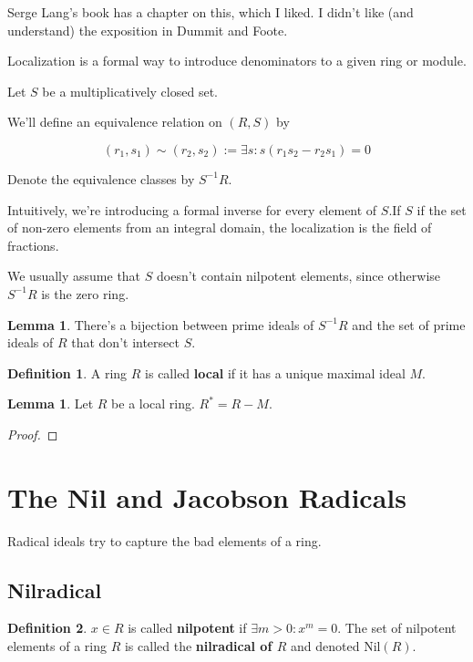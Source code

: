 \documentclass{article}
\theoremstyle{definition}
\newtheorem{definition}{Definition}
\newtheorem{lemma}[theorem]{Lemma}
\newcommand{\Nil}{\text{Nil}}
\begin{document}
Serge Lang's book has a chapter on this, which I liked. I didn't like (and understand)
the exposition in Dummit and Foote.

Localization is a formal way to introduce denominators to a given ring
or module.

Let $S$ be a multiplicatively closed set. 

We'll define an equivalence relation on $(R,S)$ by

\[ (r_{1},s_{1}) \sim (r_{2},s_{2}) := \exists s: s(r_{1}s_{2} - r_{2}s_{1}) = 0\]

Denote the equivalence classes by $S^{-1}R$.

Intuitively, we're introducing a formal inverse for every element of $S$.If $S$ if the set of non-zero
elements from an integral domain, the localization is the field of fractions.

We usually assume that $S$ doesn't contain nilpotent elements, since otherwise $S^{-1}R$
is the zero ring.

\begin{lemma}
    There's a bijection between prime ideals of $S^{-1}R$ and the set of prime ideals of $R$
    that don't intersect $S$.
\end{lemma}

\begin{definition}
    A ring $R$ is called \textbf{local} if it has a unique maximal ideal $M$.
\end{definition}

\begin{lemma}
    Let $R$ be a local ring. $R^{*} = R - M$.
\end{lemma}
\begin{proof}

\end{proof}



\newpage

\section{The Nil and Jacobson Radicals}

Radical ideals try to capture the bad elements of a ring.

\subsection{Nilradical}

\begin{definition}
    $x \in R$ is called \textbf{nilpotent} if $\exists m > 0: x^{m} = 0$.
    The set of nilpotent elements of a ring $R$ is called the \textbf{nilradical of $R$}
    and denoted $\Nil(R)$.
\end{definition}
\end{document}
